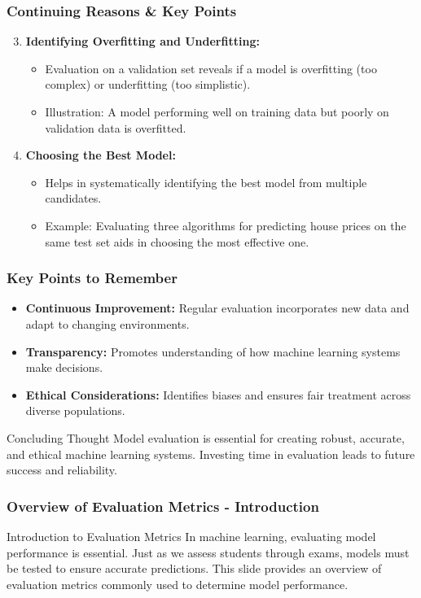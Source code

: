 \documentclass[aspectratio=169]{beamer}
\begin{document}
\begin{frame}[fragile]
    \frametitle{Continuing Reasons & Key Points}
    \begin{enumerate}
        \setcounter{enumi}{2}
        \item \textbf{Identifying Overfitting and Underfitting:}
            \begin{itemize}
                \item Evaluation on a validation set reveals if a model is overfitting (too complex) or underfitting (too simplistic).
                \item Illustration: A model performing well on training data but poorly on validation data is overfitted.
            \end{itemize}
        \item \textbf{Choosing the Best Model:}
            \begin{itemize}
                \item Helps in systematically identifying the best model from multiple candidates.
                \item Example: Evaluating three algorithms for predicting house prices on the same test set aids in choosing the most effective one.
            \end{itemize}
    \end{enumerate}
\end{frame}

\begin{frame}[fragile]
    \frametitle{Key Points to Remember}
    \begin{itemize}
        \item \textbf{Continuous Improvement:} Regular evaluation incorporates new data and adapt to changing environments.
        \item \textbf{Transparency:} Promotes understanding of how machine learning systems make decisions.
        \item \textbf{Ethical Considerations:} Identifies biases and ensures fair treatment across diverse populations.
    \end{itemize}
    \begin{block}{Concluding Thought}
        Model evaluation is essential for creating robust, accurate, and ethical machine learning systems. Investing time in evaluation leads to future success and reliability.
    \end{block}
\end{frame}

\begin{frame}[fragile]
    \frametitle{Overview of Evaluation Metrics - Introduction}
    \begin{block}{Introduction to Evaluation Metrics}
        In machine learning, evaluating model performance is essential. 
        Just as we assess students through exams, models must be tested to ensure accurate predictions.
        This slide provides an overview of evaluation metrics commonly used to determine model performance.
    \end{block}
\end{frame}
\end{document}
